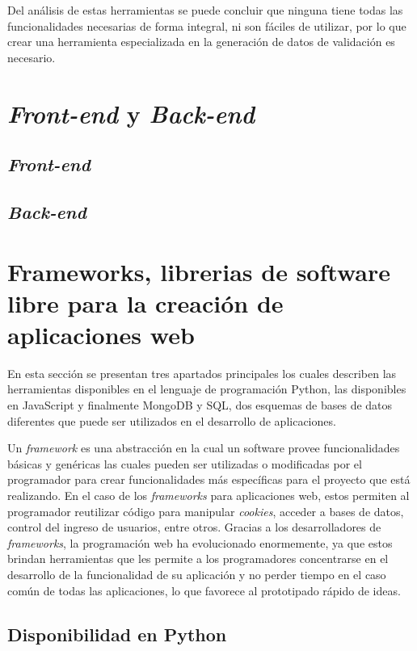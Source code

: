 Del análisis de estas herramientas se puede concluir que ninguna tiene todas las funcionalidades necesarias de forma integral, ni son fáciles de utilizar, por lo que crear una herramienta especializada en la generación de datos de validación es necesario.

\section{\textit{Front-end} y \textit{Back-end}}

\subsection{\textit{Front-end}}

\subsection{\textit{Back-end}}

\section{Frameworks, librerias de software libre para la creación de aplicaciones web}

En esta sección se presentan tres apartados principales los cuales describen las herramientas disponibles en el lenguaje de programación Python, las disponibles en JavaScript y finalmente MongoDB y SQL, dos esquemas de bases de datos diferentes que puede ser utilizados en el desarrollo de aplicaciones.

Un \textit{framework} es una abstracción en la cual un software provee funcionalidades básicas y genéricas las cuales pueden ser utilizadas o modificadas por el programador para crear funcionalidades más específicas para el proyecto que está realizando. En el caso de los \textit{frameworks} para aplicaciones web, estos permiten al programador reutilizar código para manipular \textit{cookies}, acceder a bases de datos, control del ingreso de usuarios, entre otros. Gracias a los desarrolladores de \textit{frameworks}, la programación web ha evolucionado enormemente, ya que estos brindan herramientas que les permite a los programadores concentrarse en el desarrollo de la funcionalidad de su aplicación y no perder tiempo en el caso común de todas las aplicaciones, lo que favorece al prototipado rápido de ideas.

\subsection{Disponibilidad en Python}

